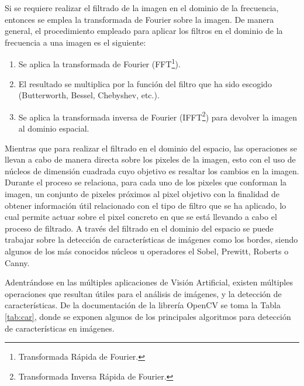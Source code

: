 \par Si se requiere realizar el filtrado de la imagen en el dominio de la frecuencia, entonces se emplea la transformada de Fourier sobre la imagen. De manera general, el procedimiento empleado para aplicar los filtros en el dominio de la frecuencia a una imagen es el siguiente:
\begin{enumerate}
	\item Se aplica la transformada de Fourier (FFT\footnote{Transformada Rápida de Fourier.}).
	\item El resultado se multiplica por la función del filtro que ha sido escogido (Butterworth, Bessel, Chebyshev, etc.).
	\item Se aplica la transformada inversa de Fourier (IFFT\footnote{Transformada Inversa Rápida de Fourier.}) para devolver la imagen al dominio espacial.
\end{enumerate}
\par Mientras que para realizar el filtrado en el dominio del espacio, las operaciones se llevan a cabo de manera directa sobre los pixeles de la imagen, esto con el uso de núcleos de dimensión cuadrada cuyo objetivo es resaltar los cambios en la imagen. Durante el proceso se relaciona, para cada uno de los pixeles que conforman la imagen, un conjunto de pixeles próximos al pixel objetivo con la finalidad de obtener información útil relacionado con el tipo de filtro que se ha aplicado, lo cual permite actuar sobre el pixel concreto en que se está llevando a cabo el proceso de filtrado. A través del filtrado en el dominio del espacio se puede trabajar sobre la detección de características de imágenes como los bordes, siendo algunos de los más conocidos núcleos u operadores el Sobel, Prewitt, Roberts o Canny.
\par Adentrándose en las múltiples aplicaciones de Visión Artificial, existen múltiples operaciones que resultan útiles para el análisis de imágenes, y la detección de características. De la documentación de la librería OpenCV\cite{opencvOpenCVReferenceManual} se toma la Tabla \ref{tab:car}, donde se exponen algunos de los principales algoritmos para detección de características en imágenes.
